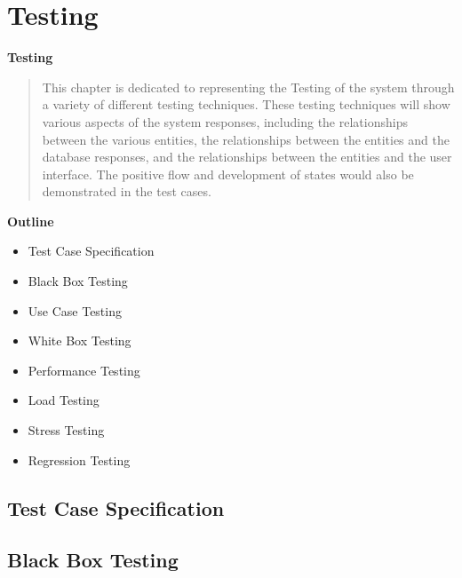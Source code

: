 
\section{Testing}

\vspace{20mm}


\Huge{\textbf{Testing}}

\vspace{20mm}


\begin{abstract}

    This chapter is dedicated to representing the Testing of the system
    through a variety of different testing techniques. These testing techniques will show
    various aspects of the system responses, including the relationships between the
    various entities, the relationships between the entities and the database responses,
    and the relationships between the entities and the user interface.
    The positive flow and development of states would also be demonstrated in the test cases.


\end{abstract}

\vspace{20mm}

\large{\textbf{Outline}}

\begin{center}
    \begin{itemize}
        \item Test Case Specification
        \item Black Box Testing
        \item Use Case Testing
        \item White Box Testing
        \item Performance Testing
        \item Load Testing
        \item Stress Testing
        \item Regression Testing
    \end{itemize}
\end{center}
\pagebreak


\subsection{Test Case Specification}

\subsection{ Black Box Testing}

